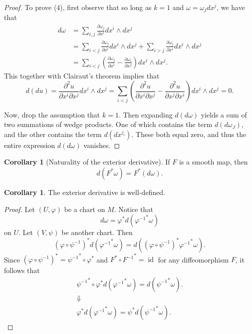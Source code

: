\documentclass[10pt,letterpaper,cm]{nupset}
\theoremstyle{definition}
\theoremstyle{theorem}
\newtheorem{corollary}[definition]{Corollary}
\theoremstyle{remark}
\newcommand{\1}{\mathbf{1}}
\newcommand{\0}{\vec 0}
\DeclareMathOperator{\id}{id}
\begin{document}
\begin{proof}
To prove (4), first observe that so long as $k=1$ and  $\omega = \omega_jdx^j$, we have that
\begin{align*}
d \omega & =   \sum_{i, j}\frac{\partial{\omega_j}}{\partial{x^i}}dx^i \wedge dx^j 
\\ & = \sum_{i< j}\frac{\partial{\omega_j}}{\partial{x^i}}dx^i \wedge dx^j + \sum_{i>j}\frac{\partial{\omega_j}}{\partial{x^i}}dx^i \wedge dx^j 
\\ & =\sum_{i<j}\left(\frac{\partial{\omega_j}}{\partial{x^i}} - \frac{\partial{\omega_i}}{\partial{x^j}}\right)dx^i \wedge dx^j.
\end{align*} This together with Clairaut's theorem implies that  $$d(du) =\frac{\partial^2{u}}{\partial{x^i}\partial{x^j}}dx^i \wedge dx^j = \sum_{i<j}\left( \frac{\partial^2{u}}{\partial{x^i}\partial{x^j}} - \frac{\partial^2{u}}{\partial{x^j}\partial{x^i}}\right)dx^i \wedge dx^j = 0.  $$ 

Now, drop the assumption that $k=1$. Then expanding $d(d\omega)$ yields a sum of two summations of wedge products. One of which contains the term $d(d\omega_J)$, and the other contains the term $d(dx^{j_i})$. These both equal zero, and thus the entire expression $d(d\omega)$ vanishes.
\end{proof}

\begin{corollary}[Naturality of the exterior derivative]\label{natural}
If $F$ is a smooth map, then $$d(F^{\ast} \omega) = F^{\ast}(d \omega).$$
\end{corollary}

\begin{corollary}
The exterior derivative is well-defined.
\end{corollary}
\begin{proof}
Let $\left(U, \varphi\right)$ be a chart on $M$. Notice that $$d\omega = \varphi^{\ast} d\left({\varphi^{-1}}^{\ast}\omega\right)$$ on $U$. Let $\left(V, \psi\right)$ be another chart. Then $$ \left(\varphi \circ \psi^{-1}\right)^{\ast} d\left({\varphi^{-1}}^{\ast} \omega\right) =  d\left( \left(\varphi \circ \psi^{-1}\right)^{\ast}{\varphi^{-1}}^{\ast} \omega\right).$$ Since $\left(\varphi \circ \psi^{-1}\right)^{\ast} = {\psi^{-1}}^{\ast} \circ \varphi^{\ast}$ and $F^{\ast} \circ {F^{-1}}^{\ast}= \id$ for any diffeomorphism $F$, 
it follows that 
\begin{gather*}
{\psi^{-1}}^{\ast} \circ \varphi^{\ast}d\left({\varphi^{-1}}^{\ast} \omega\right) = d\left({\psi^{-1}}^{\ast} \omega\right).
\\ \Downarrow
 \\ \varphi^{\ast}d\left({\varphi^{-1}}^{\ast} \omega\right)  = \psi^{\ast} d\left({\psi^{-1}}^{\ast} \omega\right).
 \end{gather*}
\end{proof}
\end{document}
